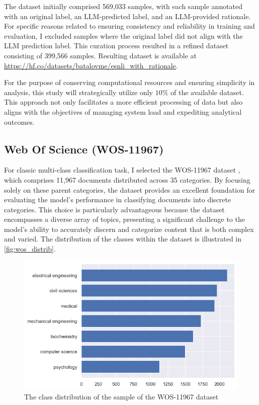 The dataset initially comprised 569,033 samples, with each sample annotated with an original label, an LLM-predicted label, and an LLM-provided rationale. For specific reasons related to ensuring consistency and reliability in training and evaluation, I excluded samples where the original label did not align with the LLM prediction label. This curation process resulted in a refined dataset consisting of 399,566 samples. Resulting dataset is available at \linebreak \url{https://hf.co/datasets/batalovme/esnli_with_rationale}.

For the purpose of conserving computational resources and ensuring simplicity in analysis, this study will strategically utilize only $10\%$ of the available dataset. This approach not only facilitates a more efficient processing of data but also aligns with the objectives of managing system load and expediting analytical outcomes.

\subsection{Web Of Science (WOS-11967)}
\label{sec:wos}

For classic multi-class classification task, I selected the WOS-11967 dataset \cite{wos}, which comprises 11,967 documents distributed across 35 categories. By focusing solely on these parent categories, the dataset provides an excellent foundation for evaluating the model’s performance in classifying documents into discrete categories. This choice is particularly advantageous because the dataset encompasses a diverse array of topics, presenting a significant challenge to the model's ability to accurately discern and categorize content that is both complex and varied. The distribution of the classes within the dataset is illustrated in \autoref{fig:wos_distrib}.

\begin{figure}[hbt]
    \centering
    \includegraphics[width=0.8\linewidth]{figs/wos_distrib.png}
    \caption{The class distribution of the sample of the WOS-11967 dataset}
    \label{fig:wos_distrib}
\end{figure}

